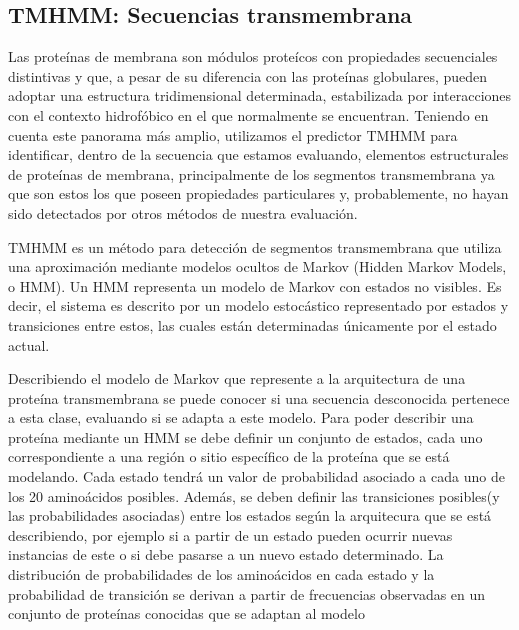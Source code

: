   
  
  
  
  
\subsection{TMHMM: Secuencias transmembrana} \label{tmhmm}

Las proteínas de membrana son módulos proteícos con propiedades secuenciales distintivas y que, a pesar de su diferencia con las proteínas globulares, 
pueden adoptar una estructura tridimensional determinada, estabilizada por interacciones con el contexto hidrofóbico en el que normalmente se encuentran.
Teniendo en cuenta este panorama más amplio, utilizamos el predictor TMHMM \cite{krogh2001predicting} para identificar, dentro de la secuencia que estamos evaluando, elementos estructurales de proteínas de membrana,
principalmente de los segmentos transmembrana ya que son estos los que poseen propiedades particulares y, probablemente, no hayan sido detectados por otros métodos de nuestra evaluación.

TMHMM es un método para detección de segmentos transmembrana que utiliza una aproximación mediante modelos ocultos de Markov (Hidden Markov Models, o HMM).
Un HMM representa un modelo de Markov con estados no visibles. Es decir, el sistema es descrito por un modelo estocástico representado por estados y transiciones entre estos, las cuales están determinadas únicamente por el estado actual.

Describiendo el modelo de Markov que represente a la arquitectura de una proteína transmembrana se puede conocer si una secuencia desconocida pertenece a esta clase, evaluando si se adapta a este modelo.
Para poder describir una proteína mediante un HMM se debe definir un conjunto de estados, cada uno correspondiente a una región o sitio específico de la proteína que se está modelando.
Cada estado tendrá un valor de probabilidad asociado a cada uno de los 20 aminoácidos posibles. Además, se deben definir las transiciones posibles(y las probabilidades asociadas) entre los estados según la arquitecura que se está describiendo, por ejemplo si a partir 
de un estado pueden ocurrir nuevas instancias de este o si debe pasarse a un nuevo estado determinado.
La distribución de probabilidades de los aminoácidos en cada estado y la probabilidad de transición se derivan a partir de frecuencias observadas en un conjunto de proteínas conocidas que se adaptan al modelo

